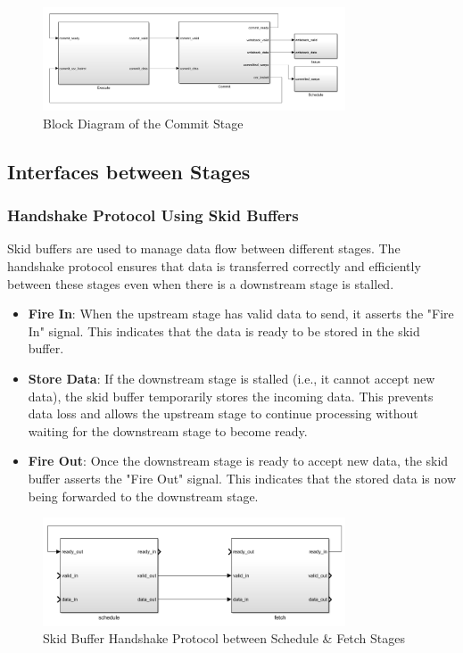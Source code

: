 \documentclass[12pt]{report}
\begin{document}
\begin{figure}[H]
    \centering
    \includegraphics[width=0.8\textwidth]{./figures/commit.png}
    \caption{Block Diagram of the Commit Stage}
\end{figure}

\subsection{Interfaces between Stages}

\subsubsection{Handshake Protocol Using Skid Buffers}

Skid buffers are used to manage data flow between different stages. The handshake protocol ensures that data is transferred correctly and efficiently between these stages even when there is a downstream stage is stalled.

\begin{itemize}
    \item \textbf{Fire In}: When the upstream stage has valid data to send, it asserts the "Fire In" signal. This indicates that the data is ready to be stored in the skid buffer.
    
    \item \textbf{Store Data}: If the downstream stage is stalled (i.e., it cannot accept new data), the skid buffer temporarily stores the incoming data. This prevents data loss and allows the upstream stage to continue processing without waiting for the downstream stage to become ready.
    
    \item \textbf{Fire Out}: Once the downstream stage is ready to accept new data, the skid buffer asserts the "Fire Out" signal. This indicates that the stored data is now being forwarded to the downstream stage.
\end{itemize}
\begin{figure}[H]
    \centering
    \includegraphics[width=0.8\textwidth]{./figures/handshake.png}
    \caption{Skid Buffer Handshake Protocol between Schedule \& Fetch Stages}
\end{figure}
\end{document}
